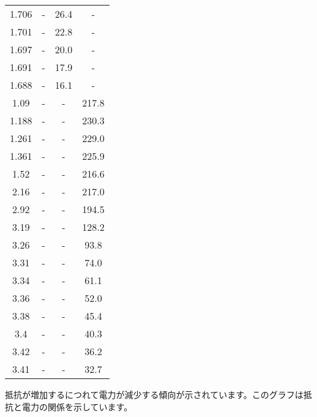 \documentclass[a4paper,11pt,xelatex,ja=standard]{bxjsarticle}
\begin{document}
\begin{table}[H]
\begin{tabular}{|c|c|c|c|}
                    1.706 & - & 26.4 & - \\
                    1.701 & - & 22.8 & - \\
                    1.697 & - & 20.0 & - \\
                    1.691 & - & 17.9 & - \\
                    1.688 & - & 16.1 & - \\
                    1.09 & - & - & 217.8 \\
                    1.188 & - & - & 230.3 \\
                    1.261 & - & - & 229.0 \\
                    1.361 & - & - & 225.9 \\
                    1.52 & - & - & 216.6 \\
                    2.16 & - & - & 217.0 \\
                    2.92 & - & - & 194.5 \\
                    3.19 & - & - & 128.2 \\
                    3.26 & - & - & 93.8 \\
                    3.31 & - & - & 74.0 \\
                    3.34 & - & - & 61.1 \\
                    3.36 & - & - & 52.0 \\
                    3.38 & - & - & 45.4 \\
                    3.4 & - & - & 40.3 \\
                    3.42 & - & - & 36.2 \\
                    3.41 & - & - & 32.7 \\
                    \hline
                \end{tabular}
            \end{table}

            

            抵抗が増加するにつれて電力が減少する傾向が示されています。このグラフは抵抗と電力の関係を示しています。
\end{document}
